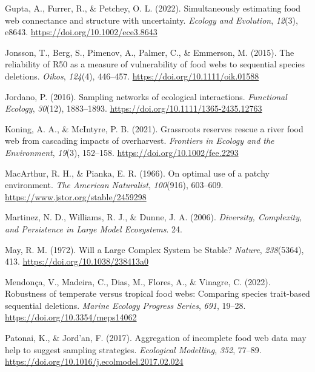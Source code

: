 \documentclass{article}
\newlength{\cslhangindent}
\newlength{\cslentryspacingunit} %
\newenvironment{CSLReferences}[2] %
 {%
  \setlength{\parindent}{0pt}
  \ifodd #1
  \let\oldpar\par
  \def\par{\hangindent=\cslhangindent\oldpar}
  \fi
  \setlength{\parskip}{#2\cslentryspacingunit}
 }%
 {}
\begin{document}
\begin{CSLReferences}{1}{0}
\leavevmode{}%
Gupta, A., Furrer, R., \& Petchey, O. L. (2022). Simultaneously
estimating food web connectance and structure with uncertainty.
\emph{Ecology and Evolution}, \emph{12}(3), e8643.
\url{https://doi.org/10.1002/ece3.8643}

\leavevmode{}%
Jonsson, T., Berg, S., Pimenov, A., Palmer, C., \& Emmerson, M. (2015).
The reliability of {R50} as a measure of vulnerability of food webs to
sequential species deletions. \emph{Oikos}, \emph{124}(4), 446--457.
\url{https://doi.org/10.1111/oik.01588}

\leavevmode{}%
Jordano, P. (2016). Sampling networks of ecological interactions.
\emph{Functional Ecology}, \emph{30}(12), 1883--1893.
\url{https://doi.org/10.1111/1365-2435.12763}

\leavevmode{}%
Koning, A. A., \& McIntyre, P. B. (2021). Grassroots reserves rescue a
river food web from cascading impacts of overharvest. \emph{Frontiers in
Ecology and the Environment}, \emph{19}(3), 152--158.
\url{https://doi.org/10.1002/fee.2293}

\leavevmode{}%
MacArthur, R. H., \& Pianka, E. R. (1966). On optimal use of a patchy
environment. \emph{The American Naturalist}, \emph{100}(916), 603--609.
\url{https://www.jstor.org/stable/2459298}

\leavevmode{}%
Martinez, N. D., Williams, R. J., \& Dunne, J. A. (2006).
\emph{Diversity, {Complexity}, and {Persistence} in {Large Model
Ecosystems}}. 24.

\leavevmode{}%
May, R. M. (1972). Will a {Large Complex System} be {Stable}?
\emph{Nature}, \emph{238}(5364), 413.
\url{https://doi.org/10.1038/238413a0}

\leavevmode{}%
Mendonça, V., Madeira, C., Dias, M., Flores, A., \& Vinagre, C. (2022).
Robustness of temperate versus tropical food webs: Comparing species
trait-based sequential deletions. \emph{Marine Ecology Progress Series},
\emph{691}, 19--28. \url{https://doi.org/10.3354/meps14062}

\leavevmode{}%
Patonai, K., \& Jord'an, F. (2017). Aggregation of incomplete food web
data may help to suggest sampling strategies. \emph{Ecological
Modelling}, \emph{352}, 77--89.
\url{https://doi.org/10.1016/j.ecolmodel.2017.02.024}


\end{CSLReferences}
\end{document}
